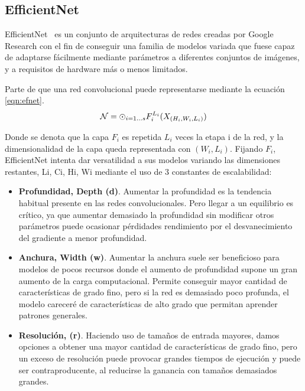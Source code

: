 \subsection{EfficientNet}
\label{efnetcap}

EfficientNet~\cite{Chaturvedi_2020} es un conjunto de arquitecturas de redes creadas por Google Research con el fin de conseguir una familia de modelos variada que fuese capaz de adaptarse fácilmente mediante parámetros a diferentes conjuntos de imágenes, y a requisitos de hardware más o menos limitados. 

Parte de que una red convolucional puede representarse mediante la ecuación \ref{eqn:efnet}.
      \begin{equation}\label{eqn:efnet}
	\centering
	\mathcal{N}=\odot_{i=1...s} F_i^{L_i}(X_{(H_i, W_i,L_i)})
\end{equation}

Donde se denota que la capa $F_i$ es repetida $L_i$ veces la etapa i de la red, y la dimensionalidad de la capa queda representada con ${( W_i,L_i)}$.  Fijando $F_i$, EfficientNet intenta dar versatilidad a sus modelos variando las dimensiones restantes, Li, Ci, Hi, Wi mediante el uso de 3 constantes de escalabilidad:

\begin{itemize}
	 \item  \textbf{Profundidad, Depth (d)}. Aumentar la profundidad es la tendencia habitual presente en las redes convolucionales. Pero llegar a un equilibrio es crítico, ya que aumentar demasiado la profundidad sin modificar otros parámetros puede ocasionar pérdidades rendimiento por el desvanecimiento del gradiente  a menor profundidad. 
	\item  \textbf{Anchura, Width (w)}. Aumentar la anchura suele ser beneficioso para modelos de pocos recursos donde el aumento de profundidad supone un gran aumento de la carga computacional. Permite conseguir mayor cantidad de características de grado fino, pero si la red es demasiado poco profunda, el modelo careceré de características de alto grado que permitan aprender patrones generales.
	\item  \textbf{Resolución, (r)}. Haciendo uso de tamaños de entrada mayores, damos opciones a obtener una mayor cantidad de características de grado fino, pero un exceso de resolución puede provocar grandes tiempos de ejecución y puede ser contraproducente, al reducirse la ganancia con tamaños demasiados grandes.
\end{itemize}

